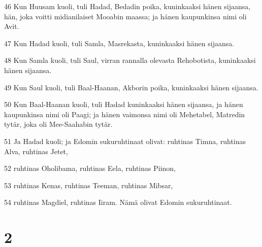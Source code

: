 \par 46 Kun Huusam kuoli, tuli Hadad, Bedadin poika, kuninkaaksi hänen sijaansa, hän, joka voitti midianilaiset Mooabin maassa; ja hänen kaupunkinsa nimi oli Avit.
\par 47 Kun Hadad kuoli, tuli Samla, Masrekasta, kuninkaaksi hänen sijaansa.
\par 48 Kun Samla kuoli, tuli Saul, virran rannalla olevasta Rehobotista, kuninkaaksi hänen sijaansa.
\par 49 Kun Saul kuoli, tuli Baal-Haanan, Akborin poika, kuninkaaksi hänen sijaansa.
\par 50 Kun Baal-Haanan kuoli, tuli Hadad kuninkaaksi hänen sijaansa, ja hänen kaupunkinsa nimi oli Paagi; ja hänen vaimonsa nimi oli Mehetabel, Matredin tytär, joka oli Mee-Saahabin tytär.
\par 51 Ja Hadad kuoli; ja Edomin sukuruhtinaat olivat: ruhtinas Timna, ruhtinas Alva, ruhtinas Jetet,
\par 52 ruhtinas Oholibama, ruhtinas Eela, ruhtinas Piinon,
\par 53 ruhtinas Kenas, ruhtinas Teeman, ruhtinas Mibsar,
\par 54 ruhtinas Magdiel, ruhtinas Iiram. Nämä olivat Edomin sukuruhtinaat.

\chapter{2}

